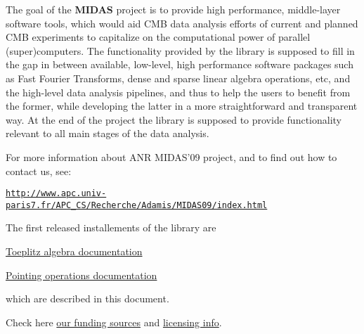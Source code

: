The goal of the {\bfseries M\-I\-D\-A\-S} project is to provide high performance, middle-\/layer software tools, which would aid C\-M\-B data analysis efforts of current and planned C\-M\-B experiments to capitalize on the computational power of parallel (super)computers. The functionality provided by the library is supposed to fill in the gap in between available, low-\/level, high performance software packages such as Fast Fourier Transforms, dense and sparse linear algebra operations, etc, and the high-\/level data analysis pipelines, and thus to help the users to benefit from the former, while developing the latter in a more straightforward and transparent way. At the end of the project the library is supposed to provide functionality relevant to all main stages of the data analysis.

For more information about A\-N\-R M\-I\-D\-A\-S'09 project, and to find out how to contact us, see\-:

\href{http://www.apc.univ-paris7.fr/APC_CS/Recherche/Adamis/MIDAS09/index.html}{\tt http\-://www.\-apc.\-univ-\/paris7.\-fr/\-A\-P\-C\-\_\-\-C\-S/\-Recherche/\-Adamis/\-M\-I\-D\-A\-S09/index.\-html}

The first released installements of the library are


\begin{DoxyItemize}
\item \hyperlink{toeplitz}{Toeplitz algebra documentation}
\item \hyperlink{pointing}{Pointing operations documentation}
\end{DoxyItemize}

which are described in this document.

Check here \hyperlink{sect_ackno}{our funding sources} and \hyperlink{page_license}{licensing info}. 